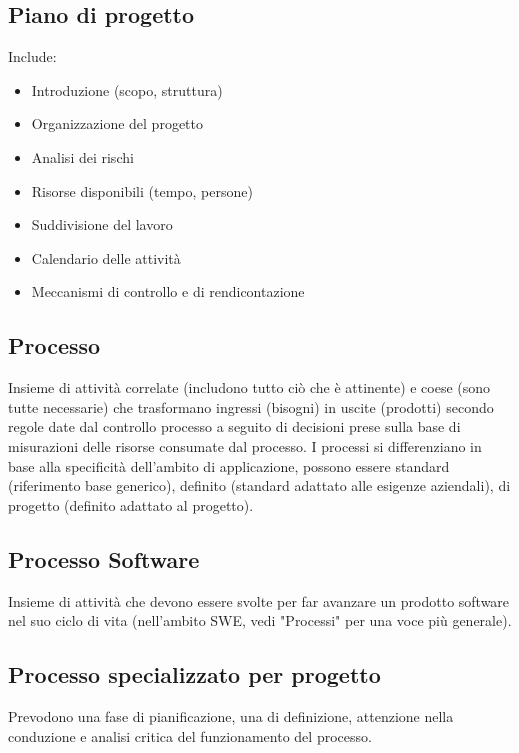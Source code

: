 	\subsection{Piano di progetto}	
	\label{sec:pianoprogetto}
	Include:
	\begin{itemize}  
	\item Introduzione (scopo, struttura)
	\item Organizzazione del progetto
	\item Analisi dei rischi
	\item Risorse disponibili (tempo, persone)
	\item Suddivisione del lavoro
	\item Calendario delle attività
	\item Meccanismi di controllo e di rendicontazione	
	\end{itemize}	
		
	\subsection{Processo}	
	\label{sec:processi}
	Insieme di attività correlate (includono tutto ciò che è attinente) e coese (sono tutte necessarie) che trasformano ingressi (bisogni) in uscite (prodotti) secondo regole date dal controllo processo a seguito di decisioni prese sulla base di misurazioni delle risorse consumate dal processo.
	I processi si differenziano in base alla specificità dell'ambito di applicazione, possono essere standard (riferimento base generico), definito (standard adattato alle esigenze aziendali), di progetto (definito adattato al progetto).
	
	\subsection{Processo Software}
	\label{sec:processisoftware}
Insieme di attività che devono essere svolte per far avanzare un prodotto software nel suo ciclo di vita (nell'ambito SWE, vedi "Processi" per una voce più generale).

	\subsection{Processo specializzato per progetto}
	\label{sec:processispecializzati}
	Prevodono una fase di pianificazione, una di definizione, attenzione nella conduzione e analisi critica del funzionamento del processo.
	
